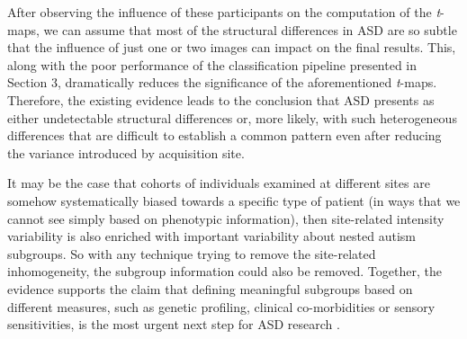 After observing the influence of these participants on the computation
of the \textit{t}{}-maps, we can assume that most of the structural
differences in \ac{ASD} are so subtle that the influence of just one or two
images can impact on the final results. This, along with the poor
performance of the classification pipeline presented in Section 3,
dramatically reduces the significance of the aforementioned
\textit{t}{}-maps. Therefore, the existing evidence leads to the
conclusion that \ac{ASD} presents as either undetectable structural
differences or, more likely, with such heterogeneous differences that
are difficult to establish a common pattern even after reducing the
variance introduced by acquisition site. 


It may be the case that cohorts of individuals examined at different sites are somehow systematically biased towards a specific type of patient (in ways that we cannot see simply based on phenotypic information), then site-related intensity variability is also enriched with important variability about nested autism subgroups. So with any technique trying to remove the site-related inhomogeneity, the subgroup information could also be removed. Together, the evidence supports the claim that defining meaningful subgroups based on different measures, such as genetic profiling, clinical co-morbidities or sensory sensitivities, is the most urgent next step for \ac{ASD} research \cite{haar2014anatomical}. 
	